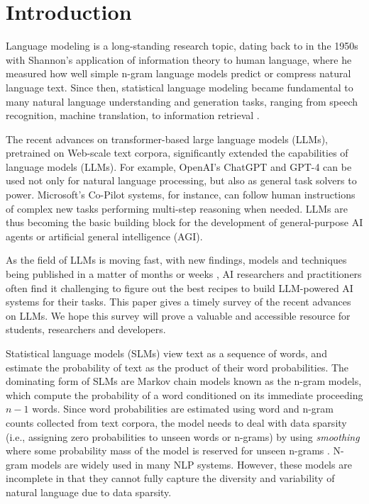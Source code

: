 \section{Introduction}
Language modeling is a long-standing research topic, dating back to in the 1950s with Shannon's application of information theory to human language, where he measured how well simple n-gram language models predict or compress natural language text. 
Since then, statistical language modeling became fundamental to many natural language understanding and generation tasks, ranging from speech recognition, machine translation, to information retrieval \cite{jelinek1998statistical,manning1999foundations,manning2009introduction}.

The recent advances on transformer-based large language models (LLMs), pretrained on Web-scale text corpora, significantly extended the capabilities of language models (LLMs). For example, OpenAI's ChatGPT and GPT-4 can be used not only for natural language processing, but also as general task solvers to power. Microsoft's Co-Pilot systems, for instance, can follow human instructions of complex new tasks performing multi-step reasoning when needed. LLMs are thus becoming the basic building block for the development of general-purpose AI agents or artificial general intelligence (AGI).

As the field of LLMs is moving fast, with new findings, models and techniques being published in a matter of months or weeks \cite{zhao2023survey,zhou2023comprehensive,liu2023pre,dong2022survey,huang2022towards}, AI researchers and practitioners often find it challenging to figure out the best recipes to build LLM-powered AI systems for their tasks. This paper gives a timely survey of the recent advances on LLMs. We hope this survey will prove a valuable and accessible resource for students, researchers and developers.


Statistical language models (SLMs) view text as a sequence of words, and estimate the probability of text as the product of their word probabilities. The dominating form of SLMs are Markov chain models known as the n-gram models, which compute the probability of a word conditioned on its immediate proceeding $n-1$ words. Since word probabilities are estimated using word and n-gram counts collected from text corpora, the model needs to deal with data sparsity (i.e., assigning zero probabilities to unseen words or n-grams) by using \emph{smoothing} where some probability mass of the model is reserved for unseen n-grams \cite{chen1999empirical}. N-gram models are widely used in many NLP systems. However, these models are incomplete in that they cannot fully capture the diversity and variability of natural language due to data sparsity.  



